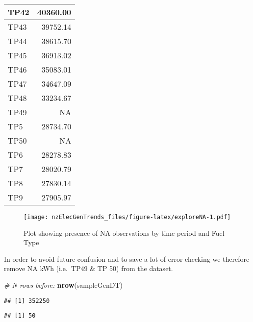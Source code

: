 \documentclass[]{article}
\newenvironment{Shaded}{\begin{snugshade}}{\end{snugshade}}
\newcommand{\KeywordTok}[1]{\textcolor[rgb]{0.13,0.29,0.53}{\textbf{#1}}}
\newcommand{\CommentTok}[1]{\textcolor[rgb]{0.56,0.35,0.01}{\textit{#1}}}
\newcommand{\OperatorTok}[1]{\textcolor[rgb]{0.81,0.36,0.00}{\textbf{#1}}}
\newcommand{\NormalTok}[1]{#1}
\theoremstyle{definition}
\theoremstyle{definition}
\theoremstyle{definition}
\theoremstyle{remark}
\begin{document}
\begin{table}
\begin{tabular}[t]{l|r}
\hline
TP42 & 40360.00\\
\hline
TP43 & 39752.14\\
\hline
TP44 & 38615.70\\
\hline
TP45 & 36913.02\\
\hline
TP46 & 35083.01\\
\hline
TP47 & 34647.09\\
\hline
TP48 & 33234.67\\
\hline
TP49 & NA\\
\hline
TP5 & 28734.70\\
\hline
TP50 & NA\\
\hline
TP6 & 28278.83\\
\hline
TP7 & 28020.79\\
\hline
TP8 & 27830.14\\
\hline
TP9 & 27905.97\\
\hline
\end{tabular}
\end{table}

\begin{figure}
\centering
\texttt{[image: nzElecGenTrends\_files/figure-latex/exploreNA-1.pdf]}
\caption{\label{fig:exploreNA}Plot showing presence of NA observations by
time period and Fuel Type}
\end{figure}

In order to avoid future confusion and to save a lot of error checking
we therefore remove NA kWh (i.e.~TP49 \& TP 50) from the dataset.

\begin{Shaded}
\begin{Highlighting}[]
\CommentTok{# N rows before:}
\KeywordTok{nrow}\NormalTok{(sampleGenDT)}
\end{Highlighting}
\end{Shaded}

\begin{verbatim}
## [1] 352250
\end{verbatim}

\begin{Shaded}
\end{Shaded}

\begin{verbatim}
## [1] 50
\end{verbatim}
\end{document}
